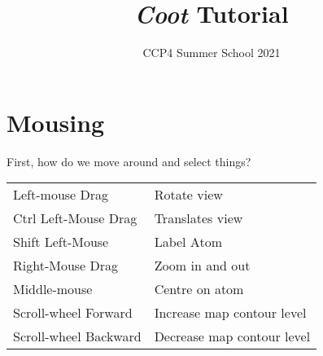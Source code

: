 \documentclass{article}
\title{\emph{Coot} Tutorial}
\author{CCP4 Summer School 2021}
\begin{document}
\maketitle
\tableofcontents
















\newpage

\section{Mousing}

First, how do we move around and select things?

\vspace{0.5cm}
  \begin{tabular}{ll}
    Left-mouse Drag & Rotate view \\
    Ctrl Left-Mouse Drag &  Translates view \\
    Shift Left-Mouse &  Label Atom\\
    Right-Mouse Drag &  Zoom in and out\index{zoom}\\
    Middle-mouse & Centre on atom\\
    Scroll-wheel Forward &  Increase map contour level\\
    Scroll-wheel Backward &  Decrease map contour level
  \end{tabular}
\vspace{0.5cm}
\end{document}
